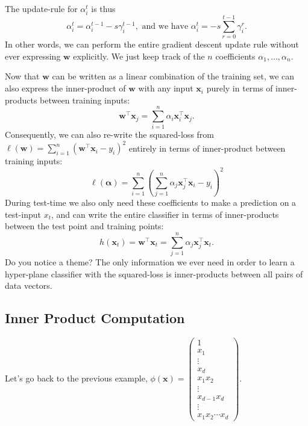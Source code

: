 \documentclass[12pt]{article}
\begin{document}
 The update-rule for $\alpha_i^t$ is thus 
 \begin{equation}
 \alpha_i^t=\alpha_i^{t-1}-s\gamma_i^{t-1}, \textrm{ and we have } \alpha_i^t=-s\sum_{r=0}^{t-1}\gamma_i^{r}.
 \end{equation}
 In other words, we can perform the entire gradient descent update rule without ever expressing $\mathbf{w}$ explicitly. We just keep track of the $n$ coefficients $\alpha_1,\dots,\alpha_n$. 
 
 Now that $\mathbf{w}$ can be written as a linear combination of the training set, we can also express the inner-product of $\mathbf{w}$ with any input ${\mathbf{x}}_i$ purely in terms of inner-products between training inputs: 
 \begin{equation}
 \mathbf{w}^\top {\mathbf{x}}_j=\sum_{i=1}^n \alpha_i {\mathbf{x}}_i^\top{\mathbf{x}}_j.\nonumber
 \end{equation}
 Consequently, we can also re-write the squared-loss from $\ell(\mathbf{w}) = \sum_{i=1}^n (\mathbf{w}^\top  \mathbf{x}_i-y_i)^2$ entirely in terms of inner-product between training inputs:
 \begin{equation}
 \ell(\mathbf{\alpha}) = \sum_{i=1}^n \left(\sum_{j=1}^n\alpha_j\mathbf{x}_j^\top  \mathbf{x}_i-y_i\right)^2\label{eq:c15:sql:ip} 
 \end{equation}
 During test-time we also only need these coefficients to make a prediction on a test-input $x_t$, and can write the entire classifier in terms of inner-products between the test point and training points:
 \begin{equation}
 h({\mathbf{x}}_t)=\mathbf{w}^\top {\mathbf{x}}_t=\sum_{j=1}^n\alpha_j{\mathbf{x}}_j^\top {\mathbf{x}}_t.
 \end{equation}
 Do you notice a theme? The only information we ever need in order to learn a hyper-plane classifier with the squared-loss is inner-products between all pairs of data vectors. 
 
 \subsection{Inner Product Computation}
 
 Let's go back to the previous example, $\phi(\mathbf{x})=\begin{pmatrix}1\\ x_1\\ \vdots \\x_d \\ x_1x_2 \\ \vdots \\ x_{d-1}x_d\\ \vdots \\x_1x_2\cdots x_d \end{pmatrix}$. 
 
\end{document}
